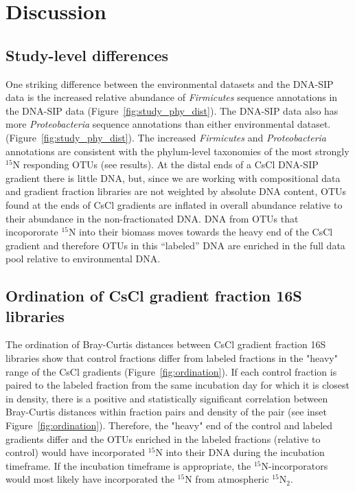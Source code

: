 \section{Discussion}
\subsection{Study-level differences}
One striking difference between the environmental datasets
\citep{Garcia_Pichel_2013, Steven_2013} and the DNA-SIP data is the
increased relative abundance of \textit{Firmicutes} sequence annotations
in the DNA-SIP data (Figure~\ref{fig:study_phy_dist}). The DNA-SIP data also
has more \textit{Proteobacteria} sequence annotations than either
environmental dataset.  (Figure~\ref{fig:study_phy_dist}).
The increased \textit{Firmicutes} and \textit{Proteobacteria} annotations are
consistent with the phylum-level taxonomies of the most strongly $^{15}$N
responding OTUs (see results). At the distal ends of a CsCl DNA-SIP gradient
there is little DNA, but, since we are working with compositional data and
gradient fraction libraries are not weighted by absolute DNA content, OTUs
found at the ends of CsCl gradients are inflated in overall abundance
relative to their abundance in the non-fractionated DNA. DNA from OTUs that
incopororate $^{15}$N into their biomass moves towards the heavy end of the
CsCl gradient and therefore OTUs in this ``labeled'' DNA are enriched in the
full data pool relative to environmental DNA. 

\subsection{Ordination of CsCl gradient fraction 16S libraries} The
ordination of Bray-Curtis distances between CsCl gradient fraction 16S
libraries show that control fractions differ from labeled fractions in the
"heavy" range of the CsCl gradients (Figure~\ref{fig:ordination}). If each
control fraction is paired to the labeled fraction from the same incubation day
for which it is closest in density, there is a positive and statistically
significant correlation between Bray-Curtis distances within fraction pairs
and density of the pair (see inset Figure~\ref{fig:ordination}).  Therefore,
the "heavy" end of the control and labeled gradients differ and the OTUs
enriched in the labeled fractions (relative to control) would have
incorporated $^{15}$N into their DNA during the incubation timeframe. If the
incubation timeframe is appropriate, the $^{15}$N-incorporators would most
likely have incorporated the $^{15}$N from atmospheric $^{15}$N$_{2}$.     

